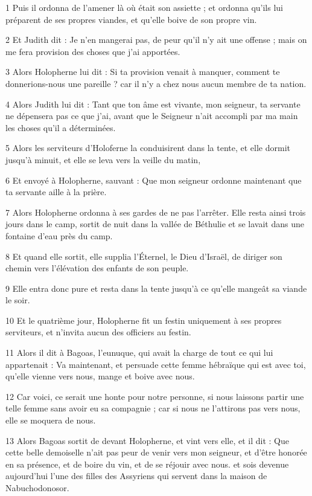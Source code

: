 
\par 1 Puis il ordonna de l'amener là où était son assiette ; et ordonna qu'ils lui préparent de ses propres viandes, et qu'elle boive de son propre vin.
\par 2 Et Judith dit : Je n'en mangerai pas, de peur qu'il n'y ait une offense ; mais on me fera provision des choses que j'ai apportées.
\par 3 Alors Holopherne lui dit : Si ta provision venait à manquer, comment te donnerions-nous une pareille ? car il n'y a chez nous aucun membre de ta nation.
\par 4 Alors Judith lui dit : Tant que ton âme est vivante, mon seigneur, ta servante ne dépensera pas ce que j'ai, avant que le Seigneur n'ait accompli par ma main les choses qu'il a déterminées.
\par 5 Alors les serviteurs d'Holoferne la conduisirent dans la tente, et elle dormit jusqu'à minuit, et elle se leva vers la veille du matin,
\par 6 Et envoyé à Holopherne, sauvant : Que mon seigneur ordonne maintenant que ta servante aille à la prière.
\par 7 Alors Holopherne ordonna à ses gardes de ne pas l'arrêter. Elle resta ainsi trois jours dans le camp, sortit de nuit dans la vallée de Béthulie et se lavait dans une fontaine d'eau près du camp.
\par 8 Et quand elle sortit, elle supplia l'Éternel, le Dieu d'Israël, de diriger son chemin vers l'élévation des enfants de son peuple.
\par 9 Elle entra donc pure et resta dans la tente jusqu'à ce qu'elle mangeât sa viande le soir.
\par 10 Et le quatrième jour, Holopherne fit un festin uniquement à ses propres serviteurs, et n'invita aucun des officiers au festin.
\par 11 Alors il dit à Bagoas, l'eunuque, qui avait la charge de tout ce qui lui appartenait : Va maintenant, et persuade cette femme hébraïque qui est avec toi, qu'elle vienne vers nous, mange et boive avec nous.
\par 12 Car voici, ce serait une honte pour notre personne, si nous laissons partir une telle femme sans avoir eu sa compagnie ; car si nous ne l’attirons pas vers nous, elle se moquera de nous.
\par 13 Alors Bagoas sortit de devant Holopherne, et vint vers elle, et il dit : Que cette belle demoiselle n'ait pas peur de venir vers mon seigneur, et d'être honorée en sa présence, et de boire du vin, et de se réjouir avec nous. et sois devenue aujourd'hui l'une des filles des Assyriens qui servent dans la maison de Nabuchodonosor.
